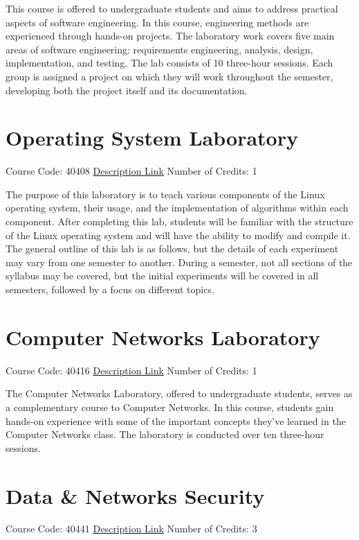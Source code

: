 This course is offered to undergraduate students and aims to address practical aspects of software engineering. In this course, engineering methods are experienced through hands-on projects. The laboratory work covers five main areas of software engineering: requirements engineering, analysis, design, implementation, and testing. The lab consists of 10 three-hour sessions. Each group is assigned a project on which they will work throughout the semester, developing both the project itself and its documentation.

\section{Operating System Laboratory}
Course Code: 40408 \qquad \quad \href{https://docs.ce.sharif.edu/course/40408}{Description Link}
\qquad \quad Number of Credits: 1

The purpose of this laboratory is to teach various components of the Linux operating system, their usage, and the implementation of algorithms within each component. After completing this lab, students will be familiar with the structure of the Linux operating system and will have the ability to modify and compile it. The general outline of this lab is as follows, but the details of each experiment may vary from one semester to another. During a semester, not all sections of the syllabus may be covered, but the initial experiments will be covered in all semesters, followed by a focus on different topics.


\section{Computer Networks Laboratory}
Course Code: 40416 \qquad \quad \href{https://docs.ce.sharif.edu/course/40416}{Description Link}
\qquad \quad Number of Credits: 1

The Computer Networks Laboratory, offered to undergraduate students, serves as a complementary course to Computer Networks. In this course, students gain hands-on experience with some of the important concepts they've learned in the Computer Networks class. The laboratory is conducted over ten three-hour sessions.

\section{Data \& Networks Security}
Course Code: 40441 \qquad \quad \href{https://docs.ce.sharif.edu/course/40441}{Description Link}
\qquad \quad Number of Credits: 3

